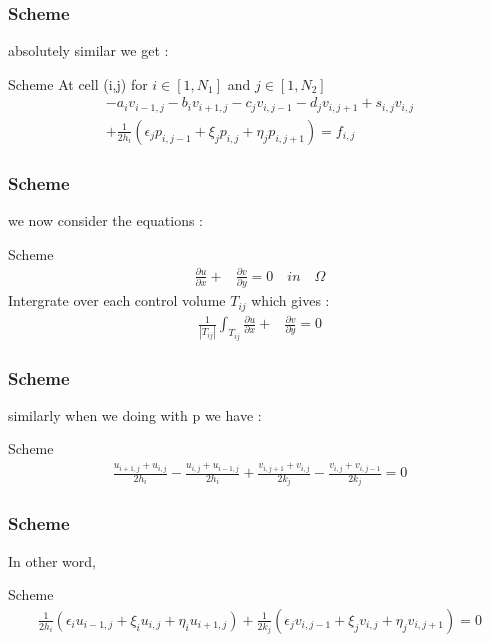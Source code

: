 \documentclass[11pt]{beamer}
\numberwithin{equation}{section}
\theoremstyle{plain}
\theoremstyle{definition}
\theoremstyle{remark}
\begin{document}
\begin{frame}\frametitle{Scheme}
absolutely similar we get :
\begin{block}{Scheme}
At cell (i,j) for $i \in [1,N_1]$ and $j\in [1,N_2]$
\begin{align*}
-a_iv_{i-1,j}-b_iv_{i+1,j}-c_jv_{i,j-1}-d_jv_{i,j+1}+s_{i,j}v_{i,j} \\
+\frac{1}{2h_{i}} \left(\epsilon_{j}p_{i,j-1} + \xi_{j}p_{i,j} + \eta_{j}p_{i,j+1}\right)
 =f_{i,j}
\end{align*}   
\end{block}
\end{frame}

\begin{frame}\frametitle{Scheme}
 we now consider the equations :
\begin{block}{Scheme}
\begin{align*}
 \frac{\partial u}{\partial x}+& \frac{\partial v}{\partial y} = 0 \quad in \quad \Omega 
\end{align*}   
Intergrate over each control volume $T_{ij}$ which gives : 
\begin{align*}
\frac{1}{|T_{ij}|}\int_{T_{ij}} \frac{\partial u}{\partial x}+& \frac{\partial v}{\partial y} = 0
\end{align*}   
\end{block}
\end{frame}
\begin{frame}\frametitle{Scheme}
similarly when we doing with p we have : 
\begin{block}{Scheme}
\begin{align*}
\frac{u_{i+1,j}+u_{i,j}}{2h_{i}}-\frac{u_{i,j}+u_{i-1,j}}{2h_{i}}+\frac{v_{i,j+1}+v_{i,j}}{2k_{j}}-\frac{v_{i,j}+v_{i,j-1}}{2k_{j}}=0
\end{align*}   
\end{block}
\end{frame}
\begin{frame}\frametitle{Scheme}
In other word, 
\begin{block}{Scheme}
\begin{align*}
\frac{1}{2h_{i}}(\epsilon_{i}u_{i-1,j}+\xi_{i}u_{i,j}+\eta_{i}u_{i+1,j})+\frac{1}{2k_{j}}(\epsilon_{j}v_{i,j-1}+\xi_{j}v_{i,j}+\eta_{j}v_{i,j+1})=0
\end{align*}   
\end{block}
\end{frame}
\end{document}

